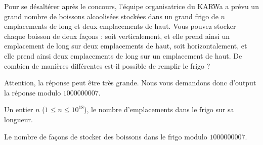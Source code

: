\problemname{\problemyamlname}


Pour se désaltérer après le concours, l'équipe organisatrice du KARWa a prévu un grand
nombre de boissons alcoolisées stockées dans un grand frigo de $n$ emplacements
de long et deux emplacements de haut. Vous pouvez stocker chaque boisson de
deux façons : soit verticalement, et elle prend ainsi un emplacement de long sur
deux emplacements de haut, soit horizontalement, et elle prend ainsi deux
emplacements de long sur un emplacement de haut. De combien de manières
différentes est-il possible de remplir le frigo ?

Attention, la réponse peut être très grande. Nous vous demandons donc d'output
la réponse modulo $1000000007$.

\begin{Input}
	Un entier $n$ ($1 \le n \le 10^18$), le nombre d'emplacements dans le frigo sur sa longueur.
\end{Input}

\begin{Output}
	Le nombre de façons de stocker des boissons dans le frigo modulo $1000000007$.
\end{Output}

